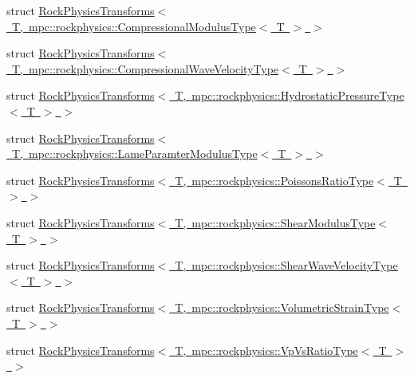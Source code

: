 \begin{DoxyCompactItemize}
\item 
struct \mbox{\hyperlink{structmpc_1_1rockphysics_1_1_rock_physics_transforms_3_01_t_00_01mpc_1_1rockphysics_1_1_compressa00c69c96057f48abd3a978c95b68f00}{Rock\+Physics\+Transforms$<$ T, mpc\+::rockphysics\+::\+Compressional\+Modulus\+Type$<$ T $>$ $>$}}
\item 
struct \mbox{\hyperlink{structmpc_1_1rockphysics_1_1_rock_physics_transforms_3_01_t_00_01mpc_1_1rockphysics_1_1_compressf65fcccb092ada4e6b4f03ee735d85ea}{Rock\+Physics\+Transforms$<$ T, mpc\+::rockphysics\+::\+Compressional\+Wave\+Velocity\+Type$<$ T $>$ $>$}}
\item 
struct \mbox{\hyperlink{structmpc_1_1rockphysics_1_1_rock_physics_transforms_3_01_t_00_01mpc_1_1rockphysics_1_1_hydrosta0770be3f580566706c66bcfacbc69794}{Rock\+Physics\+Transforms$<$ T, mpc\+::rockphysics\+::\+Hydrostatic\+Pressure\+Type$<$ T $>$ $>$}}
\item 
struct \mbox{\hyperlink{structmpc_1_1rockphysics_1_1_rock_physics_transforms_3_01_t_00_01mpc_1_1rockphysics_1_1_lame_para5e1496021e3962f82419b3f52eb8942}{Rock\+Physics\+Transforms$<$ T, mpc\+::rockphysics\+::\+Lame\+Paramter\+Modulus\+Type$<$ T $>$ $>$}}
\item 
struct \mbox{\hyperlink{structmpc_1_1rockphysics_1_1_rock_physics_transforms_3_01_t_00_01mpc_1_1rockphysics_1_1_poissons_ratio_type_3_01_t_01_4_01_4}{Rock\+Physics\+Transforms$<$ T, mpc\+::rockphysics\+::\+Poissons\+Ratio\+Type$<$ T $>$ $>$}}
\item 
struct \mbox{\hyperlink{structmpc_1_1rockphysics_1_1_rock_physics_transforms_3_01_t_00_01mpc_1_1rockphysics_1_1_shear_modulus_type_3_01_t_01_4_01_4}{Rock\+Physics\+Transforms$<$ T, mpc\+::rockphysics\+::\+Shear\+Modulus\+Type$<$ T $>$ $>$}}
\item 
struct \mbox{\hyperlink{structmpc_1_1rockphysics_1_1_rock_physics_transforms_3_01_t_00_01mpc_1_1rockphysics_1_1_shear_wa3da182e2bbb4493283e5091a086fb3f1}{Rock\+Physics\+Transforms$<$ T, mpc\+::rockphysics\+::\+Shear\+Wave\+Velocity\+Type$<$ T $>$ $>$}}
\item 
struct \mbox{\hyperlink{structmpc_1_1rockphysics_1_1_rock_physics_transforms_3_01_t_00_01mpc_1_1rockphysics_1_1_volumetric_strain_type_3_01_t_01_4_01_4}{Rock\+Physics\+Transforms$<$ T, mpc\+::rockphysics\+::\+Volumetric\+Strain\+Type$<$ T $>$ $>$}}
\item 
struct \mbox{\hyperlink{structmpc_1_1rockphysics_1_1_rock_physics_transforms_3_01_t_00_01mpc_1_1rockphysics_1_1_vp_vs_ratio_type_3_01_t_01_4_01_4}{Rock\+Physics\+Transforms$<$ T, mpc\+::rockphysics\+::\+Vp\+Vs\+Ratio\+Type$<$ T $>$ $>$}}

\end{DoxyCompactItemize}
